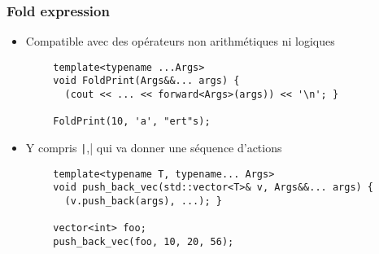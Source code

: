 \documentclass[C++.tex]{subfiles}
\begin{document}
\begin{frame}[fragile]
	\frametitle{Fold expression}
	\begin{itemize}
		\item Compatible avec des opérateurs non arithmétiques ni logiques
	\end{itemize}

	\begin{verbatim}
		template<typename ...Args>
		void FoldPrint(Args&&... args) {
		  (cout << ... << forward<Args>(args)) << '\n'; }

		FoldPrint(10, 'a', "ert"s);
	\end{verbatim}

	\begin{itemize}
		\item Y compris \og \texttt|,|\fg{} qui va donner une séquence d'actions
	\end{itemize}

	\begin{verbatim}
		template<typename T, typename... Args>
		void push_back_vec(std::vector<T>& v, Args&&... args) {
		  (v.push_back(args), ...); }

		vector<int> foo;
		push_back_vec(foo, 10, 20, 56);
	\end{verbatim}



\end{frame}
\end{document}
